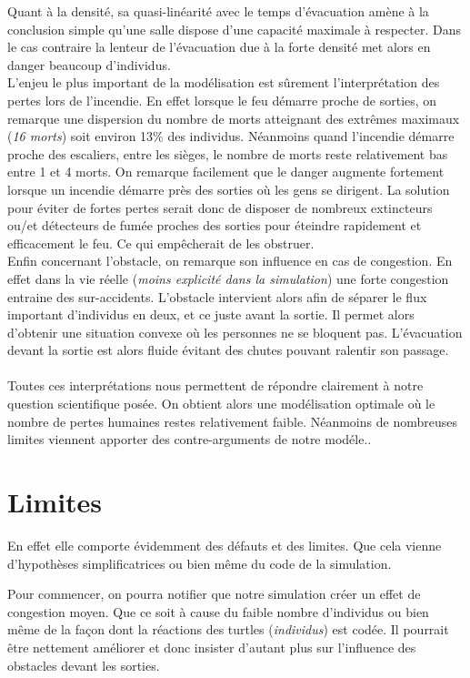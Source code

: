\documentclass{article}
\begin{document}
Quant à la densité, sa quasi-linéarité avec le temps d'évacuation amène à la conclusion simple qu'une salle dispose d'une capacité maximale à respecter. Dans le cas contraire la lenteur de l'évacuation due à la forte densité met alors en danger beaucoup d'individus. \\

L'enjeu le plus important de la modélisation est sûrement l'interprétation des pertes lors de l'incendie. En effet lorsque le feu démarre proche de sorties, on remarque une dispersion du nombre de morts atteignant des extrêmes maximaux ({\em 16 morts}) soit environ 13\% des individus. Néanmoins quand l'incendie démarre proche des escaliers, entre les sièges, le nombre de morts reste relativement bas entre 1 et 4 morts. On remarque facilement que le danger augmente fortement lorsque un incendie démarre près des sorties où les gens se dirigent. La solution pour éviter de fortes pertes serait donc de disposer de nombreux extincteurs ou/et détecteurs de fumée proches des sorties pour éteindre rapidement et efficacement le feu. Ce qui empêcherait de les obstruer.\\

Enfin concernant l'obstacle, on remarque son influence en cas de congestion. En effet dans la vie réelle ({\em moins explicité dans la simulation}) une forte congestion entraine des sur-accidents. L'obstacle intervient alors afin de séparer le flux important d'individus en deux, et ce juste avant la sortie. Il permet alors d'obtenir une situation convexe où les personnes ne se bloquent pas. L'évacuation devant la sortie est alors fluide évitant des chutes pouvant ralentir son passage. \\\\
Toutes ces interprétations nous permettent de répondre clairement à notre question scientifique posée. On obtient alors une modélisation optimale où le nombre de pertes humaines restes relativement faible. Néanmoins de nombreuses limites viennent apporter des contre-arguments de notre modéle..

\section{Limites}
En effet elle comporte évidemment des défauts et des limites. Que cela vienne d'hypothèses simplificatrices ou bien même du code de la simulation.

Pour commencer, on pourra notifier que notre simulation créer un effet de congestion moyen. Que ce soit à cause du faible nombre d’individus ou bien même de la façon dont la  réactions des turtles ({\em individus}) est codée. Il pourrait être nettement améliorer et donc insister d’autant plus sur l'influence des obstacles devant les sorties. 
\end{document}
